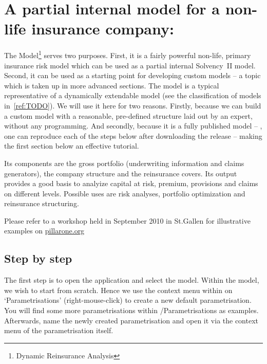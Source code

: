 \chapter[Partial internal non-life model \PODRA]{A partial internal model for a non-life insurance company: \PODRA}
\label{chap:podra}

The \PODRA{} Model\footnote{\PO{} Dynamic Reinsurance Analysis\cite{09:MunichRePodra}}
serves two purposes.  First, it is a fairly powerful non-life, primary insurance risk
model which can be used as a partial internal Solvency~II model.  Second, it can be used
as a starting point for developing custom models -- a topic which is taken up in more
advanced sections.  The \PODRA{} model is a typical representative of a dynamically
extendable model (see the classification of models in~\ref{ref:TODO}).  We will use it
here for two reasons.  Firstly, because we can build a custom model with a reasonable,
pre-defined structure laid out by an expert, without any programming.  And secondly,
because it is a fully published model -- \ie, one can reproduce each of the steps below
after downloading the release -- making the first section below an effective tutorial.

Its components are the gross portfolio (underwriting information and claims generators),
the company structure and the reinsurance covers. Its output provides a good basis to
analyize capital at risk, premium, provisions and claims on different levels. Possible
uses are risk analyses, portfolio optimization and reinsurance structuring.

Please refer to a workshop held in September 2010 in St.Gallen for illustrative examples on  \href{http://pillarone.org/collaboration/events/saa-st.-gallen-2010/presentations/2-dynamic-analysis-of-an-insurance-portfolio}{pillarone.org}


\section{Step by step}
\label{sec:podra-step}

The first step is to open the application and select the \PODRA{} model. Within the \PODRA{} 
model, we wish to start from scratch. Hence we use the context menu within \PODRA{} on
`Parametrisations' (right-mouse-click) to create a new default parametrisation. You will
find some more parametrisations within \PODRA/Parametrisations as examples. 
Afterwards, name the newly created parametrisation and open it via the context menu
of the parametrisation itself.

